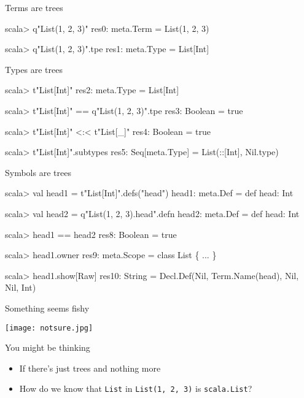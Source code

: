 \documentclass[svgnames,dvipsnames,hyperref={bookmarks=false},usepdftitle=false]{beamer}
\begin{document}
\begin{frame}[fragile]{Terms are trees}
\begin{semiverbatim}
scala> q"List(1, 2, 3)"
res0: meta.Term = List(1, 2, 3)

scala> q"List(1, 2, 3)".tpe
res1: meta.Type = List[Int]
\end{semiverbatim}
\end{frame}

\begin{frame}[fragile]{Types are trees}
\begin{semiverbatim}
scala> t"List[Int]"
res2: meta.Type = List[Int]

scala> t"List[Int]" == q"List(1, 2, 3)".tpe
res3: Boolean = true

scala> t"List[Int]" <:< t"List[_]"
res4: Boolean = true

scala> t"List[Int]".subtypes
res5: Seq[meta.Type] = List(::[Int], Nil.type)
\end{semiverbatim}
\end{frame}

\begin{frame}[fragile]{Symbols are trees}
\begin{semiverbatim}
scala> val head1 = t"List[Int]".defs("head")
head1: meta.Def = def head: Int

scala> val head2 = q"List(1, 2, 3).head".defn
head2: meta.Def = def head: Int

scala> head1 == head2
res8: Boolean = true

scala> head1.owner
res9: meta.Scope = class List \{ ... \}

scala> head1.show[Raw]
res10: String = Decl.Def(Nil, Term.Name(head), Nil, Nil, Int)
\end{semiverbatim}
\end{frame}

\begin{frame}[c, fragile]{Something seems fishy}
\begin{center}
\texttt{[image: notsure.jpg]}
\end{center}
\end{frame}

\begin{frame}{You might be thinking}
\begin{itemize}
\item If there's just trees and nothing more
\item How do we know that \texttt{List} in \texttt{List(1, 2, 3)} is \texttt{scala.List}?
\end{itemize}
\end{frame}
\end{document}
